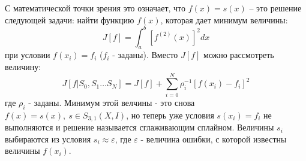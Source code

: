 С математической точки зрения это означает, что $f(x)=s(x)$ -- это решение следующей задачи: найти функцию $f(x)$, которая дает минимум величины:
\begin{equation}
J[f]=\int_a^b[f^{(2)}(x)]^2dx
\end{equation}
при условии $f(x_i)=f_i$ ($f_i$ - заданы).
Вместо $J[f]$ можно рассмотреть величину:
\begin{equation}
J[ f| S_{0},S_1\ldots S_{N}] = J \left[ f\right] + \sum ^{N}_{i=0}\rho^{-1}_{i}\left[ f\left( x_{i}\right) -f_{i}\right] ^{2}
\end{equation}
где $\rho_i$ - заданы. Минимум этой велчины - это снова $f(x)=s(x), \ s\in S_{3,1}(X,I)$, 
но теперь уже условия $s(x_i)=f_i$ не выполняются и решение называется сглаживающим сплайном. Величины $s_i$ выбираются из условия $s_i\approx \varepsilon$, где $\varepsilon$ - величина ошибки, с которой известны величины $f(x_i)$.
